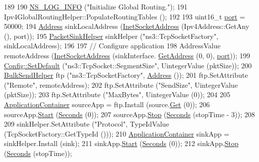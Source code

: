 \begin{DoxyCode}
189 
190   \hyperlink{group__logging_gafbd73ee2cf9f26b319f49086d8e860fb}{NS\_LOG\_INFO} (\textcolor{stringliteral}{"Initialize Global Routing."});
191   Ipv4GlobalRoutingHelper::PopulateRoutingTables ();
192 
193   uint16\_t \hyperlink{dsdv-manet_8cc_a8e0798404bf2cf5dabb84c5ba9a4f236}{port} = 50000;
194   \hyperlink{classns3_1_1Address}{Address} sinkLocalAddress (\hyperlink{classns3_1_1InetSocketAddress}{InetSocketAddress} (Ipv4Address::GetAny (), port));
195   \hyperlink{classns3_1_1PacketSinkHelper}{PacketSinkHelper} sinkHelper (\textcolor{stringliteral}{"ns3::TcpSocketFactory"}, sinkLocalAddress);
196 
197   \textcolor{comment}{// Configure application}
198   AddressValue remoteAddress (\hyperlink{classns3_1_1InetSocketAddress}{InetSocketAddress} (sinkInterface.
      \hyperlink{classns3_1_1Ipv4InterfaceContainer_ae63208dcd222be986822937ee4aa828c}{GetAddress} (0, 0), \hyperlink{dsdv-manet_8cc_a8e0798404bf2cf5dabb84c5ba9a4f236}{port}));
199   \hyperlink{group__config_ga2e7882df849d8ba4aaad31c934c40c06}{Config::SetDefault} (\textcolor{stringliteral}{"ns3::TcpSocket::SegmentSize"}, UintegerValue (pktSize));
200   \hyperlink{classns3_1_1BulkSendHelper}{BulkSendHelper} ftp (\textcolor{stringliteral}{"ns3::TcpSocketFactory"}, \hyperlink{classns3_1_1Address}{Address} ());
201   ftp.SetAttribute (\textcolor{stringliteral}{"Remote"}, remoteAddress);
202   ftp.SetAttribute (\textcolor{stringliteral}{"SendSize"}, UintegerValue (pktSize));
203   ftp.SetAttribute (\textcolor{stringliteral}{"MaxBytes"}, UintegerValue (0));
204 
205   \hyperlink{classns3_1_1ApplicationContainer}{ApplicationContainer} sourceApp = ftp.Install (source.\hyperlink{classns3_1_1NodeContainer_a9ed96e2ecc22e0f5a3d4842eb9bf90bf}{Get} (0));
206   sourceApp.\hyperlink{classns3_1_1ApplicationContainer_a8eff87926507020bbe3e1390358a54a7}{Start} (\hyperlink{group__timecivil_ga33c34b816f8ff6628e33d5c8e9713b9e}{Seconds} (0));
207   sourceApp.\hyperlink{classns3_1_1ApplicationContainer_adfc52f9aa4020c8714679b00bbb9ddb3}{Stop} (\hyperlink{group__timecivil_ga33c34b816f8ff6628e33d5c8e9713b9e}{Seconds} (stopTime - 3));
208 
209   sinkHelper.SetAttribute (\textcolor{stringliteral}{"Protocol"}, TypeIdValue (TcpSocketFactory::GetTypeId ()));
210   \hyperlink{classns3_1_1ApplicationContainer}{ApplicationContainer} sinkApp = sinkHelper.Install (sink);
211   sinkApp.\hyperlink{classns3_1_1ApplicationContainer_a8eff87926507020bbe3e1390358a54a7}{Start} (\hyperlink{group__timecivil_ga33c34b816f8ff6628e33d5c8e9713b9e}{Seconds} (0));
212   sinkApp.\hyperlink{classns3_1_1ApplicationContainer_adfc52f9aa4020c8714679b00bbb9ddb3}{Stop} (\hyperlink{group__timecivil_ga33c34b816f8ff6628e33d5c8e9713b9e}{Seconds} (stopTime));

\end{DoxyCode}
